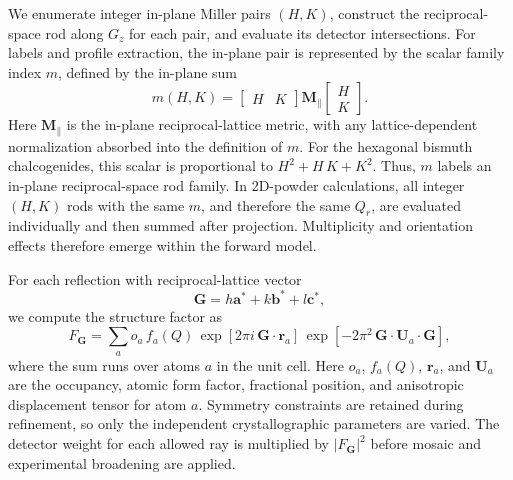 We enumerate integer in-plane Miller pairs $(H,K)$, construct the reciprocal-space rod along $G_z$ for each pair, and evaluate its detector intersections. For labels and profile extraction, the in-plane pair is represented by the scalar family index $m$, defined by the in-plane sum
\[
m(H,K)
=
\begin{bmatrix}
H & K
\end{bmatrix}
\mathbf M_{\parallel}
\begin{bmatrix}
H \\
K
\end{bmatrix}
.
\]
Here \(\mathbf M_{\parallel}\) is the in-plane reciprocal-lattice metric, with any lattice-dependent normalization absorbed into the definition of $m$. For the hexagonal bismuth chalcogenides, this scalar is proportional to $H^2+H\,K+K^2$. Thus, $m$ labels an in-plane reciprocal-space rod family. In 2D-powder calculations, all integer \((H,K)\) rods with the same $m$, and therefore the same \(Q_r\), are evaluated individually and then summed after projection. Multiplicity and orientation effects therefore emerge within the forward model.

For each reflection with reciprocal-lattice vector
\[
\mathbf G = h\mathbf a^{*} + k\mathbf b^{*} + l\mathbf c^{*},
\]
we compute the structure factor as
\begin{equation}
F_{\mathbf G} =
\sum_{a}
o_a\, f_a(Q)\,
\exp\!\left[2\pi i\, \mathbf G \cdot \mathbf r_a\right]\,
\exp\!\left[-2\pi^{2}\,\mathbf G\cdot\mathbf U_a\cdot\mathbf G\right],
\label{eq:structure_factor}
\end{equation}
where the sum runs over atoms $a$ in the unit cell. Here $o_a$, $f_a(Q)$, $\mathbf r_a$, and $\mathbf U_a$ are the occupancy, atomic form factor, fractional position, and anisotropic displacement tensor for atom $a$. Symmetry constraints are retained during refinement, so only the independent crystallographic parameters are varied. The detector weight for each allowed ray is multiplied by $|F_{\mathbf G}|^2$ before mosaic and experimental broadening are applied.

